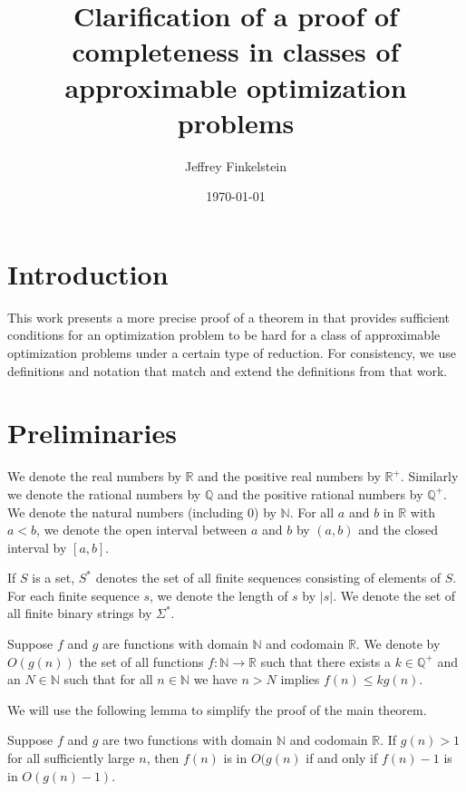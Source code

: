 \documentclass{article}
\author{Jef{}frey Finkelstein}
\date{\today}
\title{Clarification of a proof of completeness in classes of approximable optimization problems}
\begin{document}
\maketitle

\section{Introduction}
This work presents a more precise proof of a theorem in \cite{ep06} that provides sufficient conditions for an optimization problem to be hard for a class of approximable optimization problems under a certain type of reduction.
For consistency, we use definitions and notation that match and extend the definitions from that work.

\section{Preliminaries}
We denote the real numbers by $\mathbb{R}$ and the positive real numbers by $\mathbb{R}^+$.
Similarly we denote the rational numbers by $\mathbb{Q}$ and the positive rational numbers by $\mathbb{Q}^+$.
We denote the natural numbers (including 0) by $\mathbb{N}$.
For all $a$ and $b$ in $\mathbb{R}$ with $a < b$, we denote the open interval between $a$ and $b$ by $(a, b)$ and the closed interval by $[a, b]$.

If $S$ is a set, $S^*$ denotes the set of all finite sequences consisting of elements of $S$.
For each finite sequence $s$, we denote the length of $s$ by $|s|$.
We denote the set of all finite binary strings by $\Sigma^*$.

\begin{definition}\label{def:bigo}
  Suppose $f$ and $g$ are functions with domain $\mathbb{N}$ and codomain $\mathbb{R}$.
  We denote by $O(g(n))$ the set of all functions $f \colon \mathbb{N} \to \mathbb{R}$ such that there exists a $k \in \mathbb{Q}^+$ and an $N \in \mathbb{N}$ such that for all $n \in \mathbb{N}$ we have $n > N$ implies $f(n) \leq k g(n)$.
\end{definition}

We will use the following lemma to simplify the proof of the main theorem.

\begin{lemma}\label{lem:bigo}
  Suppose $f$ and $g$ are two functions with domain $\mathbb{N}$ and codomain $\mathbb{R}$.
  If $g(n) > 1$ for all sufficiently large $n$, then $f(n)$ is in $O(g(n)$ if and only if $f(n) - 1$ is in $O(g(n) - 1)$.
\end{lemma}
\end{document}
